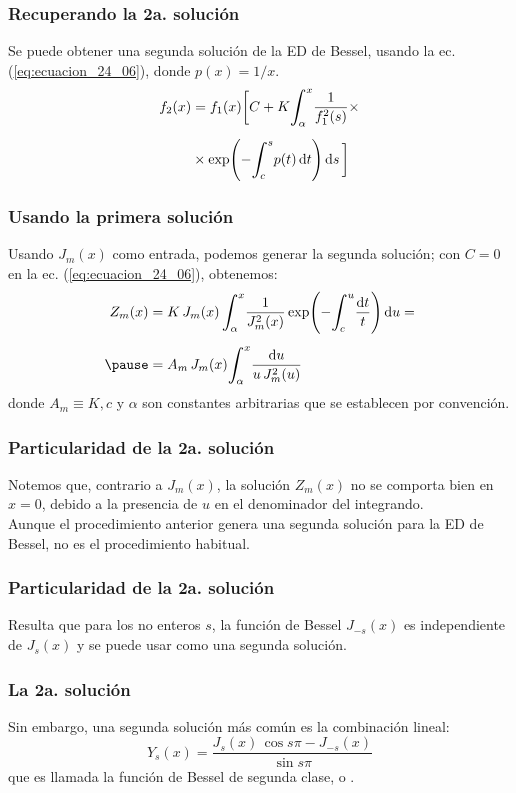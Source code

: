 \documentclass[12pt]{beamer}
\begin{document}
\begin{frame}
\frametitle{Recuperando la 2a. solución}
Se puede obtener una segunda solución de la ED de Bessel, usando la ec. (\ref{eq:ecuacion_24_06}), donde $p(x) = 1/x$.\pause
\begin{eqnarray}
\begin{aligned}
f_{2}(x) &=  f_{1}(x) \bigg[ C + K \scaleint{6ex}_{\bs \alpha}^{x} \dfrac{1}{f_{1}^{2} (s)}  \times \\[0.5em]
&\times \exp( - \scaleint{6ex}_{\bs c}^{s} p(t) \dd{t}) \dd{s} \bigg]
\end{aligned}
\label{eq:ecuacion_24_06}
\end{eqnarray}
\end{frame}
\begin{frame}
\frametitle{Usando la primera solución}
Usando $J_{m}(x)$ como entrada, podemos generar la segunda solución; con $C = 0$ en la ec. (\ref{eq:ecuacion_24_06}), obtenemos:
\pause
\begin{eqnarray*}
\begin{aligned}
Z_{m}(x) &= K \, J_{m}(x) \, \scaleint{6ex}_{\bs \alpha}^{x} \dfrac{1}{J_{m}^{2}(x)} \exp(- \scaleint{6ex}_{\bs c}^{u} \dfrac{\dd{t}}{t}) \dd{u} = \\[0.5em] \pause
&= A_{m} \, J_{m}(x) \scaleint{6ex}_{\bs \alpha}^{x} \dfrac{\dd{u}}{u \, J_{m}^{2}(u)}
\end{aligned}
\end{eqnarray*}
\pause
donde $A_{m} \equiv K , c$ y $\alpha$ son constantes arbitrarias que se establecen por convención.
\end{frame}
\begin{frame}
\frametitle{Particularidad de la 2a. solución}
Notemos que, contrario a $J_{m}(x)$, la solución $Z_{m}(x)$ no se comporta bien en $x = 0$, debido a la presencia de $u$ en el denominador del integrando.
\\
\bigskip
\pause
Aunque el procedimiento anterior genera una segunda solución para la ED de Bessel, no es el procedimiento habitual.
\end{frame}
\begin{frame}
\frametitle{Particularidad de la 2a. solución}
Resulta que para los no enteros $s$, la función de Bessel $J_{-s} (x)$ es independiente de $J_{s} (x)$ y se puede usar como una segunda solución.
\\
\bigskip
\end{frame}
\begin{frame}
\frametitle{La 2a. solución}
Sin embargo, una segunda solución más común es la combinación lineal:
\pause
\begin{equation}
Y_{s} (x) = \dfrac{J_{s}(x) \, \cos s \pi - J_{-s}(x)}{\sin s\pi}
\label{eq:ecuacion_27_11}
\end{equation}
que es llamada la función de Bessel de segunda clase, o .
\end{frame}
\end{document}
